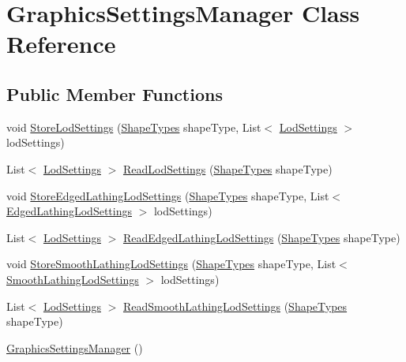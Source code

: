 \hypertarget{class_graphics_settings_manager}{}\section{Graphics\+Settings\+Manager Class Reference}
\label{class_graphics_settings_manager}
\subsection*{Public Member Functions}
\begin{DoxyCompactItemize}
\item 
void \mbox{\hyperlink{class_graphics_settings_manager_ae8cb1fa784876b8a1a7907fa0a785757}{Store\+Lod\+Settings}} (\mbox{\hyperlink{_shape_types_8cs_af0e24915ca1b4c216da56b86a5f3de13}{Shape\+Types}} shape\+Type, List$<$ \mbox{\hyperlink{class_lod_settings}{Lod\+Settings}} $>$ lod\+Settings)
\item 
List$<$ \mbox{\hyperlink{class_lod_settings}{Lod\+Settings}} $>$ \mbox{\hyperlink{class_graphics_settings_manager_a6883354bfc01606cf75d70e067d0a28d}{Read\+Lod\+Settings}} (\mbox{\hyperlink{_shape_types_8cs_af0e24915ca1b4c216da56b86a5f3de13}{Shape\+Types}} shape\+Type)
\item 
void \mbox{\hyperlink{class_graphics_settings_manager_acd5f867b4893c148f46b267901130ce0}{Store\+Edged\+Lathing\+Lod\+Settings}} (\mbox{\hyperlink{_shape_types_8cs_af0e24915ca1b4c216da56b86a5f3de13}{Shape\+Types}} shape\+Type, List$<$ \mbox{\hyperlink{class_edged_lathing_lod_settings}{Edged\+Lathing\+Lod\+Settings}} $>$ lod\+Settings)
\item 
List$<$ \mbox{\hyperlink{class_lod_settings}{Lod\+Settings}} $>$ \mbox{\hyperlink{class_graphics_settings_manager_a9492feedb687bce9bf90ac72ecd81188}{Read\+Edged\+Lathing\+Lod\+Settings}} (\mbox{\hyperlink{_shape_types_8cs_af0e24915ca1b4c216da56b86a5f3de13}{Shape\+Types}} shape\+Type)
\item 
void \mbox{\hyperlink{class_graphics_settings_manager_af0136cd657b53d839c722092cfd691f2}{Store\+Smooth\+Lathing\+Lod\+Settings}} (\mbox{\hyperlink{_shape_types_8cs_af0e24915ca1b4c216da56b86a5f3de13}{Shape\+Types}} shape\+Type, List$<$ \mbox{\hyperlink{class_smooth_lathing_lod_settings}{Smooth\+Lathing\+Lod\+Settings}} $>$ lod\+Settings)
\item 
List$<$ \mbox{\hyperlink{class_lod_settings}{Lod\+Settings}} $>$ \mbox{\hyperlink{class_graphics_settings_manager_a5eb8cc166509d6efe01f2cd3683b7766}{Read\+Smooth\+Lathing\+Lod\+Settings}} (\mbox{\hyperlink{_shape_types_8cs_af0e24915ca1b4c216da56b86a5f3de13}{Shape\+Types}} shape\+Type)
\item 
\mbox{\hyperlink{class_graphics_settings_manager_a4d02f60a64880fa16f2aaf4000cbbfe9}{Graphics\+Settings\+Manager}} ()
\end{DoxyCompactItemize}



